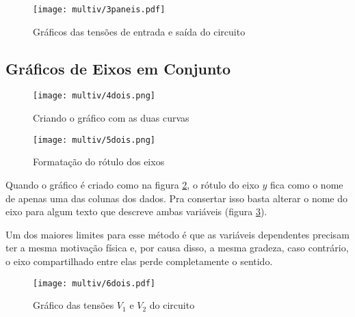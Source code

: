     \begin{figure}[H]
        \centering
        \texttt{[image: multiv/3paneis.pdf]}

        \caption{Gráficos das tensões de entrada e saída do circuito}
        \label{fig:multiv:paneis}
    \end{figure}


\subsection{Gráficos de Eixos em Conjunto}

    \begin{figure}[htbp]
        \centering
        \texttt{[image: multiv/4dois.png]}

        \caption{Criando o gráfico com as duas curvas}
        \label{fig:multiv:juntos:tutorial}
    \end{figure}

    \noindent
    \begin{minipage}[t]{0.35\textwidth}
        \begin{figure}[H]
            \centering
            \texttt{[image: multiv/5dois.png]}

            \caption{Formatação do rótulo dos eixos}
            \label{fig:multiv:juntos:formatacao}
        \end{figure}
    \end{minipage}\hspace{0.05\textwidth}%
    \begin{minipage}[t]{0.6\textwidth}\setlength{\parindent}{\indentacao}

        Quando o gráfico é criado como na figura \ref{fig:multiv:juntos:tutorial}, o rótulo do eixo $y$ fica como o nome de apenas uma das colunas dos dados. Pra consertar isso basta alterar o nome do eixo para algum texto que descreve ambas variáveis (figura \ref{fig:multiv:juntos:formatacao}).

        Um dos maiores limites para esse método é que as variáveis dependentes precisam ter a mesma motivação física e, por causa disso, a mesma gradeza, caso contrário, o eixo compartilhado entre elas perde completamente o sentido.

    \end{minipage}

    \begin{figure}[htbp]
        \centering
        \texttt{[image: multiv/6dois.pdf]}

        \caption{Gráfico das tensões $V_1$ e $V_2$ do circuito}
        \label{fig:multiv:juntos}
    \end{figure}


